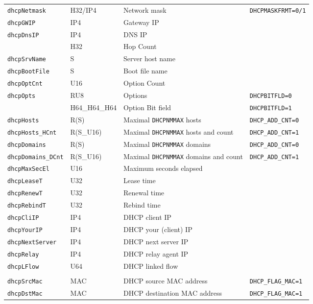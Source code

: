 \documentclass[documentation]{subfiles}
\begin{document}
\begin{longtable}{llll}
    {\tt dhcpNetmask}         & H32/IP4       & Network mask & {\tt DHCPMASKFRMT=0/1}\\
    {\tt dhcpGWIP}            & IP4           & Gateway IP\\
    {\tt dhcpDnsIP}           & IP4           & DNS IP\\
    {\tt\nameref{dhcpHopCnt}} & H32           & Hop Count\\
    {\tt dhcpSrvName}         & S             & Server host name\\
    {\tt dhcpBootFile}        & S             & Boot file name\\
    {\tt dhcpOptCnt}          & U16           & Option Count\\
    {\tt dhcpOpts}            & RU8           & Options & {\tt DHCPBITFLD=0}\\
    {\tt\nameref{dhcpOptBF}}  & H64\_H64\_H64 & Option Bit field & {\tt DHCPBITFLD=1}\\
    {\tt dhcpHosts}           & R(S)          & Maximal {\tt DHCPNMMAX} hosts             & {\tt DHCP\_ADD\_CNT=0}\\
    {\tt dhcpHosts\_HCnt}     & R(S\_U16)     & Maximal {\tt DHCPNMMAX} hosts and count   & {\tt DHCP\_ADD\_CNT=1}\\
    {\tt dhcpDomains}         & R(S)          & Maximal {\tt DHCPNMMAX} domains           & {\tt DHCP\_ADD\_CNT=0}\\
    {\tt dhcpDomains\_DCnt}   & R(S\_U16)     & Maximal {\tt DHCPNMMAX} domains and count & {\tt DHCP\_ADD\_CNT=1}\\
    {\tt dhcpMaxSecEl}        & U16           & Maximum seconds elapsed\\
    {\tt dhcpLeaseT}          & U32           & Lease time\\
    {\tt dhcpRenewT}          & U32           & Renewal time\\
    {\tt dhcpRebindT}         & U32           & Rebind time\\
    {\tt dhcpCliIP}           & IP4           & DHCP client IP\\
    {\tt dhcpYourIP}          & IP4           & DHCP your (client) IP\\
    {\tt dhcpNextServer}      & IP4           & DHCP next server IP\\
    {\tt dhcpRelay}           & IP4           & DHCP relay agent IP\\
    {\tt dhcpLFlow}           & U64           & DHCP linked flow\\
    \\
    {\tt dhcpSrcMac}          & MAC           & DHCP source MAC address      & {\tt DHCP\_FLAG\_MAC=1}\\
    {\tt dhcpDstMac}          & MAC           & DHCP destination MAC address & {\tt DHCP\_FLAG\_MAC=1}\\
    \bottomrule
\end{longtable}
\end{document}
